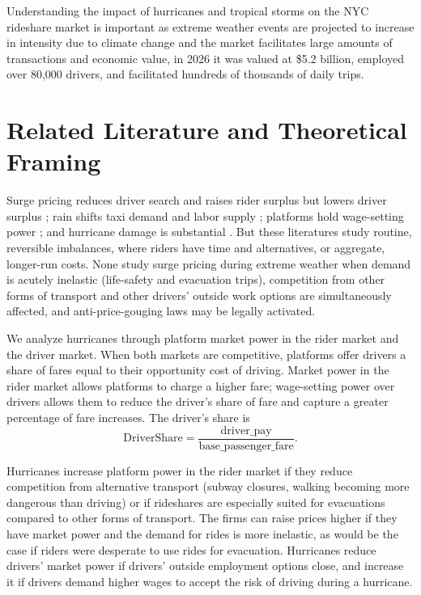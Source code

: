 \documentclass[11pt]{article}
\begin{document}
Understanding the impact of hurricanes and tropical storms on the NYC rideshare market is important as extreme weather events are projected to increase in intensity due to climate change and the market facilitates large amounts of transactions and economic value, in 2026 it was valued at \$5.2 billion, employed over 80,000 drivers, and facilitated hundreds of thousands of daily trips.

\section{Related Literature and Theoretical Framing}

Surge pricing reduces driver search \citep{castillo2017} and raises rider surplus but lowers driver surplus \citep{castillo2025}; rain shifts taxi demand and labor supply \citep{farber2015,brodeur2018}; platforms hold wage-setting power \citep{dube2020}; and hurricane damage is substantial \citep{kahn2005,hsiang2014,deryugina2017}. But these literatures study routine, reversible imbalances, where riders have time and alternatives, or aggregate, longer-run costs. None study surge pricing during extreme weather when demand is acutely inelastic (life-safety and evacuation trips), competition from other forms of transport and other drivers' outside work options are simultaneously affected, and anti-price-gouging laws may be legally activated.

We analyze hurricanes through platform market power in the rider market and the driver market. When both markets are competitive, platforms offer drivers a share of fares equal to their opportunity cost of driving. Market power in the rider market allows platforms to charge a higher fare; wage-setting power over drivers allows them to reduce the driver's share of fare and capture a greater percentage of fare increases. The driver's share is
\begin{equation}
\text{DriverShare} = \frac{\text{driver\_pay}}{\text{base\_passenger\_fare}}.
\end{equation}

Hurricanes increase platform power in the rider market if they reduce competition from alternative transport (subway closures, walking becoming more dangerous than driving) or if rideshares are especially suited for evacuations compared to other forms of transport. The firms can raise prices higher if they have market power and the demand for rides is more inelastic, as would be the case if riders were desperate to use rides for evacuation. Hurricanes reduce drivers' market power if drivers' outside employment options close, and increase it if drivers demand higher wages to accept the risk of driving during a hurricane. 
\end{document}
